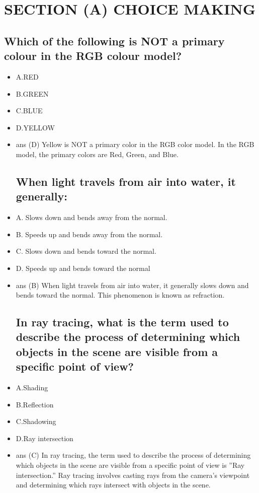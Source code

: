 \documentclass{article}
\begin{document}
\section{SECTION (A) CHOICE MAKING }
\subsection{Which of the following is NOT a primary colour in the RGB colour model?}
\begin{itemize}
\item A.RED
\item B.GREEN
\item C.BLUE
\item D.YELLOW
\item ans (D) Yellow is NOT a primary color in the RGB color model. In the
RGB model, the primary colors are Red, Green, and Blue.
\subsection{ When light travels from air into water, it generally:}
\item A. Slows down and bends away from the normal.
\item B. Speeds up and bends away from the normal.
\item C. Slows down and bends toward the normal.
\item D. Speeds up and bends toward the normal
\item  ans (B) When light travels from air into water, it generally slows down
and bends toward the normal. This phenomenon is known as refraction.
\subsection{In ray tracing, what is the term used to describe
the process of determining which objects in the scene
are visible from a specific point of view?}
\item A.Shading
\item B.Reflection
\item C.Shadowing
\item D.Ray intersection
\item ans (C) In ray tracing, the term used to describe the process of determining
which objects in the scene are visible from a specific point of view is
”Ray intersection.” Ray tracing involves casting rays from the camera’s
viewpoint and determining which rays intersect with objects in the scene.

\end{itemize}
\end{document}
